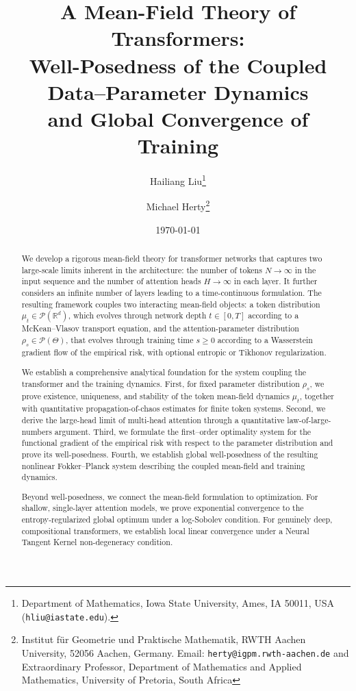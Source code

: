 \documentclass[11pt,a4wide]{article}
\title{A Mean-Field Theory of Transformers:\\
Well-Posedness of the Coupled Data--Parameter Dynamics\\
and Global Convergence of Training}
\author{Hailiang Liu\thanks{Department of Mathematics, Iowa State University, Ames, IA 50011, USA (\texttt{hliu@iastate.edu}).} 
\and 
{Michael Herty\thanks{Institut für Geometrie und Praktische Mathematik, RWTH Aachen University, 52056 Aachen, Germany. Email: \texttt{herty@igpm.rwth-aachen.de} and 
Extraordinary Professor, Department of Mathematics and Applied Mathematics,  University of Pretoria, South Africa
}}
}
\date{\today}
\theoremstyle{definition}
\begin{document}
%
\maketitle
%
%
\begin{abstract}
We develop a rigorous mean-field theory for transformer networks that captures
 two large-scale limits inherent in the architecture: the
number of tokens $N\to\infty$ in the input  sequence and the number of attention heads
$H\to\infty$ in each layer. It further considers an infinite number of layers leading
to a time-continuous formulation.  The resulting framework couples two interacting
mean-field objects: a token distribution $\mu_t\in\mathcal P(\mathbb R^d)$,
which evolves through network depth $t\in[0,T]$ according to a
McKean--Vlasov transport equation, and the attention-parameter distribution
$\rho_s\in\mathcal P(\Theta)$, that evolves through training time
$s\ge0$ according to a Wasserstein gradient flow of the empirical risk, with
optional entropic or Tikhonov  regularization.

We establish a comprehensive analytical foundation for the system coupling 
the transformer and the training dynamics. 
First, for fixed parameter distribution $\rho_s$, we prove existence, uniqueness, and
stability of the token mean-field dynamics $\mu_t$, together with quantitative
propagation-of-chaos estimates for finite token systems. Second, we derive the
large-head limit of multi-head attention through a quantitative law-of-large-
numbers argument. Third, we formulate the first--order 
optimality system for the functional gradient of the
empirical risk with respect to the parameter distribution and prove its
well-posedness. Fourth, we establish global well-posedness of the resulting
nonlinear Fokker--Planck system describing the coupled mean-field and training dynamics.

Beyond well-posedness, we connect the mean-field formulation to optimization.
For shallow, single-layer attention models, we prove exponential convergence
to the entropy-regularized global optimum under a log-Sobolev condition. For
genuinely deep, compositional transformers, we establish local linear
convergence under a Neural Tangent Kernel non-degeneracy condition. 


\end{abstract}
\end{document}
